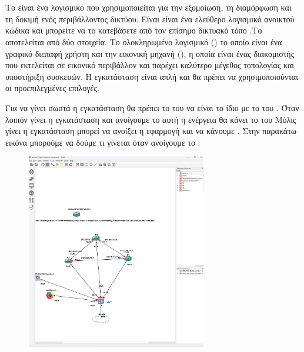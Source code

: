 \chapter{}

\section{}

Το  είναι ένα λογισμικό που χρησιμοποιείται για την εξομοίωση, τη διαμόρφωση και τη δοκιμή ενός περιβάλλοντος δικτύου. Είναι
είναι ένα ελεύθερο λογισμικό ανοικτού κώδικα και μπορείτε να το κατεβάσετε από τον επίσημο δικτυακό τόπο 
 .Το  αποτελείται από δύο στοιχεία. Το ολοκληρωμένο λογισμικό () το οποίο είναι ένα γραφικό 
διεπαφή χρήστη και την εικονική μηχανή (), η οποία είναι ένας διακομιστής που εκτελείται σε εικονικό περιβάλλον και παρέχει καλύτερο μέγεθος τοπολογίας και υποστήριξη συσκευών.
Η εγκατάσταση είναι απλή και θα πρέπει να χρησιμοποιούνται οι προεπιλεγμένες επιλογές.

Για να γίνει σωστά η εγκατάσταση θα πρέπει το  του  να είναι το ίδιο με το
 του . Όταν λοιπόν γίνει η εγκατάσταση και ανοίγουμε το 
αυτή η ενέργεια θα κάνει  το  του 
Μόλις γίνει η εγκατάσταση μπορεί να ανοίξει η εφαρμογή και να κάνουμε . Στην παρακάτω
εικόνα μπορούμε να δούμε τι γίνεται όταν ανοίγουμε το . 

\begin{figure}[h]
	\centering
	\includegraphics[width=0.7\textwidth]{graphics/gns3_homepage.png}
	\caption{ }
\end{figure}


